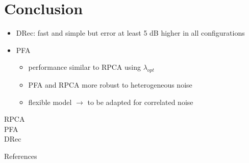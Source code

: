 \documentclass[9pt,xcolor=x11names,compress, notes=show]{beamer}%
\begin{document}
\section*{Conclusion}
\begin{frame}{\insertsectionhead}
	\begin{itemize}
		\item DRec: fast and simple but error at least 5 dB higher in all configurations
		\item PFA 
		\begin{itemize}
		        \item performance similar to RPCA using $\lambda_{opt}$
			\item PFA and RPCA more robust to heterogeneous noise	
			\item flexible model $\rightarrow$ to be adapted for correlated noise	
		\end{itemize}
	\end{itemize}
	
	\begin{center}
		\hspace{-1cm}
		\begin{multicols}{3}
				RPCA\\ PFA \\DRec
		\end{multicols}
	\end{center}

	

\end{frame}


\appendix
\begin{frame}{References}
		
		
\end{frame}


% 
% 
\end{document}
